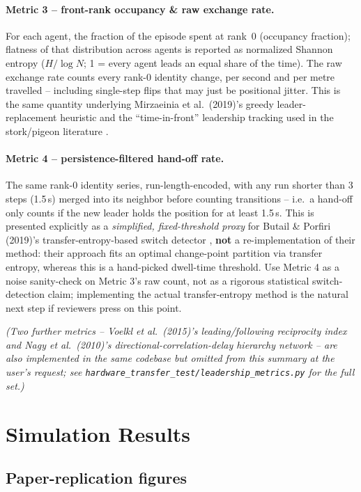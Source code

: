 \documentclass[11pt]{article}
\begin{document}
\paragraph{Metric 3 -- front-rank occupancy \& raw exchange rate.} For each agent, the fraction
of the episode spent at rank~0 (occupancy fraction); flatness of that distribution across agents
is reported as normalized Shannon entropy ($H/\log N$; 1 = every agent leads an equal share of
the time). The raw exchange rate counts every rank-0 identity change, per second and per metre
travelled -- including single-step flips that may just be positional jitter. This is the same
quantity underlying Mirzaeinia et al.\ (2019)'s greedy leader-replacement heuristic and the
``time-in-front'' leadership tracking used in the stork/pigeon literature \cite{mirzaeinia2019}.

\paragraph{Metric 4 -- persistence-filtered hand-off rate.} The same rank-0 identity series,
run-length-encoded, with any run shorter than 3 steps (1.5\,s) merged into its neighbor before
counting transitions -- i.e.\ a hand-off only counts if the new leader holds the position for at
least 1.5\,s. This is presented explicitly as a \emph{simplified, fixed-threshold proxy} for
Butail \& Porfiri (2019)'s transfer-entropy-based switch detector \cite{butail2019}, \textbf{not}
a re-implementation of their method: their approach fits an optimal change-point partition via
transfer entropy, whereas this is a hand-picked dwell-time threshold. Use Metric 4 as a
noise sanity-check on Metric 3's raw count, not as a rigorous statistical switch-detection claim;
implementing the actual transfer-entropy method is the natural next step if reviewers press on
this point.

\emph{(Two further metrics -- Voelkl et al.\ (2015)'s leading/following reciprocity index and
Nagy et al.\ (2010)'s directional-correlation-delay hierarchy network -- are also implemented in
the same codebase but omitted from this summary at the user's request; see
\texttt{hardware\_transfer\_test/leadership\_metrics.py} for the full set.)}

\section{Simulation Results}

\subsection{Paper-replication figures}
\label{sec:paper-figs}
\end{document}
